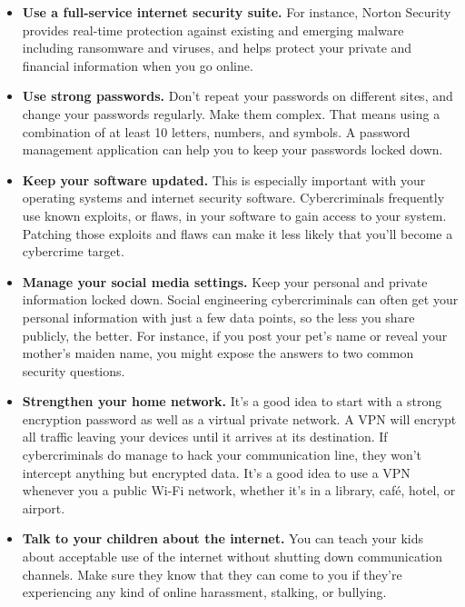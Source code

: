 \documentclass [12pt, a4paper]{article}
\begin{document}
\begin{itemize}

\item \textbf{Use a full-service internet security suite.} For instance, Norton Security provides real-time protection against existing and emerging malware including ransomware and viruses, and helps protect your private and financial information when you go online.

\item \textbf{Use strong passwords.} Don’t repeat your passwords on different sites, and change your passwords regularly. Make them complex. That means using a combination of at least 10 letters, numbers, and symbols. A password management application can help you to keep your passwords locked down.

\item \textbf{Keep your software updated.} This is especially important with your operating systems and internet security software. Cybercriminals frequently use known exploits, or flaws, in your software to gain access to your system. Patching those exploits and flaws can make it less likely that you’ll become a cybercrime target.

\item \textbf{Manage your social media settings.} Keep your personal and private information locked down. Social engineering cybercriminals can often get your personal information with just a few data points, so the less you share publicly, the better. For instance, if you post your pet’s name or reveal your mother’s maiden name, you might expose the answers to two common security questions.

\item \textbf{Strengthen your home network.} It’s a good idea to start with a strong encryption password as well as a virtual private network. A VPN will encrypt all traffic leaving your devices until it arrives at its destination. If cybercriminals do manage to hack your communication line, they won’t intercept anything but encrypted data. It’s a good idea to use a VPN whenever you a public Wi-Fi network, whether it’s in a library, café, hotel, or airport.

\item \textbf{Talk to your children about the internet.} You can teach your kids about acceptable use of the internet without shutting down communication channels. Make sure they know that they can come to you if they’re experiencing any kind of online harassment, stalking, or bullying.


\end{itemize}
\end{document}
